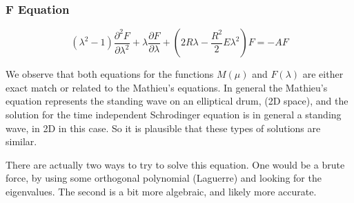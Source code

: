 \subsubsection{ F Equation }

\begin{equation}\label{eqLG3}
(\lambda^2-1)\frac{\partial^2 F}{\partial \lambda^2} + \lambda\frac{\partial F}{\partial \lambda} + \left(2R\lambda -  \frac{R^2}{2} E\lambda^2\right) F = -AF
\end{equation}

We observe that both equations for the functions $ M(\mu) $ and $ F(\lambda) $ are either exact match or related to the Mathieu's equations. In general the Mathieu's equation represents the standing wave on an elliptical drum, (2D space), and the solution for the time independent Schrodinger equation is in general a standing wave, in 2D in this case. So it is plausible that these types of solutions are similar.

There are actually two ways to try to solve this equation. One would be a brute force, by using some orthogonal polynomial (Laguerre) and looking for the eigenvalues.
The second is a bit more algebraic, and likely more accurate.

